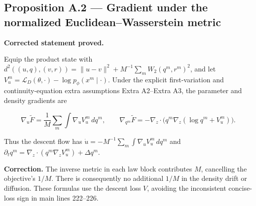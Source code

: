 \documentclass[11pt,a4paper]{report}
\begin{document}
\subsection{\texorpdfstring{Proposition A.2 — Gradient under the normalized Euclidean–Wasserstein metric}{Proposition A.2 — Gradient under the normalized Euclidean–Wasserstein metric}}


\textbf{Corrected statement proved.}



Equip the product state with
        \(d^2((u,q),(v,r))=\|u-v\|^2+M^{-1}\sum_mW_2(q^m,r^m)^2\), and let
        \(V_u^m=\mathcal L_D(\theta,\cdot)-\log p_\phi(x^m\mid\cdot)\).
        Under the explicit first-variation and continuity-equation
        extra assumptions Extra A2–Extra A3, the parameter and density gradients are


        \[\nabla_u\widetilde F=\frac1M\sum_m\int\nabla_u V_u^m\,dq^m,
        \qquad
        \nabla_{q^m}\widetilde F=-\nabla_z\!\cdot
           \bigl(q^m\nabla_z(\log q^m+V_u^m)\bigr).\]


Thus the descent flow has
        \(\dot u=-M^{-1}\sum_m\int\nabla_uV_u^m\,dq^m\) and
        \(\partial_tq^m=\nabla_z\cdot(q^m\nabla_zV_u^m)+\Delta q^m\).



\textbf{Correction.} The inverse metric in each law block contributes
        \(M\), cancelling the objective's \(1/M\). There is consequently no
        additional \(1/M\) in the density drift or diffusion. These formulas
        use the descent loss \(V\), avoiding the inconsistent concise-loss sign
        in main lines 222–226.
\end{document}
